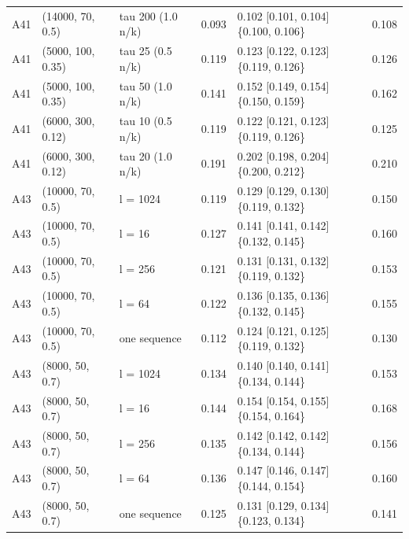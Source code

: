 \begin{tabular}{llllll}
A41 & (14000, 70, 0.5) & tau 200 (1.0 n/k) & 0.093 & 0.102 [0.101, 0.104] \{0.100, 0.106\} & 0.108 \\
A41 & (5000, 100, 0.35) & tau 25 (0.5 n/k) & 0.119 & 0.123 [0.122, 0.123] \{0.119, 0.126\} & 0.126 \\
A41 & (5000, 100, 0.35) & tau 50 (1.0 n/k) & 0.141 & 0.152 [0.149, 0.154] \{0.150, 0.159\} & 0.162 \\
A41 & (6000, 300, 0.12) & tau 10 (0.5 n/k) & 0.119 & 0.122 [0.121, 0.123] \{0.119, 0.126\} & 0.125 \\
A41 & (6000, 300, 0.12) & tau 20 (1.0 n/k) & 0.191 & 0.202 [0.198, 0.204] \{0.200, 0.212\} & 0.210 \\
A43 & (10000, 70, 0.5) & l = 1024 & 0.119 & 0.129 [0.129, 0.130] \{0.119, 0.132\} & 0.150 \\
A43 & (10000, 70, 0.5) & l = 16 & 0.127 & 0.141 [0.141, 0.142] \{0.132, 0.145\} & 0.160 \\
A43 & (10000, 70, 0.5) & l = 256 & 0.121 & 0.131 [0.131, 0.132] \{0.119, 0.132\} & 0.153 \\
A43 & (10000, 70, 0.5) & l = 64 & 0.122 & 0.136 [0.135, 0.136] \{0.132, 0.145\} & 0.155 \\
A43 & (10000, 70, 0.5) & one sequence & 0.112 & 0.124 [0.121, 0.125] \{0.119, 0.132\} & 0.130 \\
A43 & (8000, 50, 0.7) & l = 1024 & 0.134 & 0.140 [0.140, 0.141] \{0.134, 0.144\} & 0.153 \\
A43 & (8000, 50, 0.7) & l = 16 & 0.144 & 0.154 [0.154, 0.155] \{0.154, 0.164\} & 0.168 \\
A43 & (8000, 50, 0.7) & l = 256 & 0.135 & 0.142 [0.142, 0.142] \{0.134, 0.144\} & 0.156 \\
A43 & (8000, 50, 0.7) & l = 64 & 0.136 & 0.147 [0.146, 0.147] \{0.144, 0.154\} & 0.160 \\
A43 & (8000, 50, 0.7) & one sequence & 0.125 & 0.131 [0.129, 0.134] \{0.123, 0.134\} & 0.141 \\
\bottomrule
\end{tabular}
